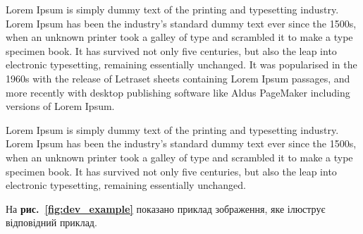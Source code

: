 
Lorem Ipsum is simply dummy text of the printing and typesetting industry.
Lorem Ipsum has been the industry’s standard dummy text ever since the 1500s, when
an unknown printer took a galley of type and scrambled it to make a type specimen
book. It has survived not only five centuries, but also the leap into electronic typesetting,
remaining essentially unchanged. It was popularised in the 1960s with the release of
Letraset sheets containing Lorem Ipsum passages, and more recently with desktop
publishing software like Aldus PageMaker including versions of Lorem Ipsum.


Lorem Ipsum is simply dummy text of the printing and typesetting industry.
Lorem Ipsum has been the industry’s standard dummy text ever since the 1500s, when
an unknown printer took a galley of type and scrambled it to make a type specimen
book. It has survived not only five centuries, but also the leap into electronic typesetting,
remaining essentially unchanged.


На \textbf{рис.~\ref{fig:dev_example}} показано приклад зображення, яке ілюструє відповідний приклад.
